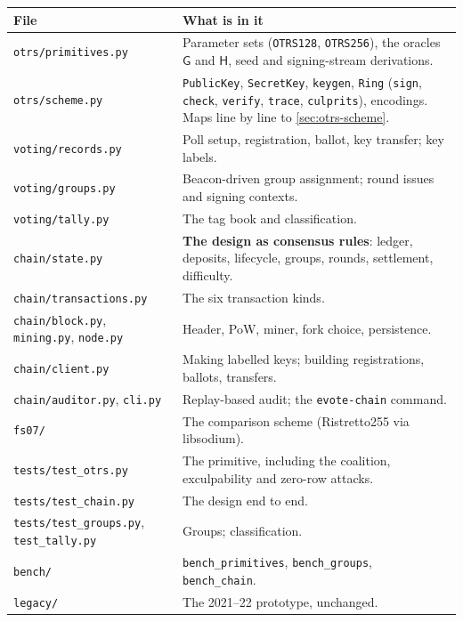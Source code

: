 \documentclass[11pt,a4paper]{article}
\newcommand{\Gf}{\mathsf{G}}
\newcommand{\Hf}{\mathsf{H}}
\newcommand{\file}[1]{\texttt{#1}}
\theoremstyle{definition}
\begin{document}
\begin{center}
\small
\begin{tabularx}{\textwidth}{l X}
\toprule
File & What is in it \\
\midrule
\file{otrs/primitives.py}   & Parameter sets (\texttt{OTRS128}, \texttt{OTRS256}), the oracles $\Gf$ and $\Hf$, seed and signing-stream derivations. \\
\file{otrs/scheme.py}       & \texttt{PublicKey}, \texttt{SecretKey}, \texttt{keygen}, \texttt{Ring} (\texttt{sign}, \texttt{check}, \texttt{verify}, \texttt{trace}, \texttt{culprits}), encodings. Maps line by line to \cref{sec:otrs-scheme}. \\
\file{voting/records.py}    & Poll setup, registration, ballot, key transfer; key labels. \\
\file{voting/groups.py}     & Beacon-driven group assignment; round issues and signing contexts. \\
\file{voting/tally.py}      & The tag book and classification. \\
\file{chain/state.py}       & \textbf{The design as consensus rules}: ledger, deposits, lifecycle, groups, rounds, settlement, difficulty. \\
\file{chain/transactions.py}& The six transaction kinds. \\
\file{chain/block.py}, \file{mining.py}, \file{node.py} & Header, PoW, miner, fork choice, persistence. \\
\file{chain/client.py}      & Making labelled keys; building registrations, ballots, transfers. \\
\file{chain/auditor.py}, \file{cli.py} & Replay-based audit; the \texttt{evote-chain} command. \\
\file{fs07/}                & The comparison scheme (Ristretto255 via libsodium). \\
\file{tests/test\_otrs.py}  & The primitive, including the coalition, exculpability and zero-row attacks. \\
\file{tests/test\_chain.py} & The design end to end. \\
\file{tests/test\_groups.py}, \file{test\_tally.py} & Groups; classification. \\
\file{bench/}               & \texttt{bench\_primitives}, \texttt{bench\_groups}, \texttt{bench\_chain}. \\
\file{legacy/}              & The 2021--22 prototype, unchanged. \\
\bottomrule
\end{tabularx}
\end{center}
\end{document}
